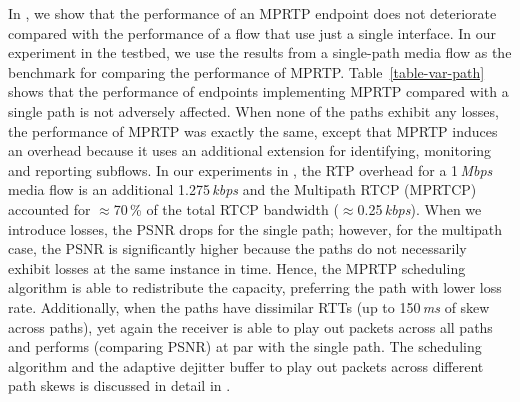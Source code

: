In , we show that the performance of an MPRTP
endpoint does not deteriorate compared with the performance of a flow
that use just a single interface. In our experiment in the testbed, we use the
results from a single-path media flow as the benchmark for comparing the
performance of MPRTP. Table~\ref{table-var-path} shows that the performance of
endpoints implementing MPRTP compared with a single path is not adversely
affected. When none of the paths exhibit any losses, the performance of MPRTP
was exactly the same, except that MPRTP induces an overhead because it uses an
additional extension for identifying, monitoring and reporting subflows. In
our experiments in , the RTP overhead for a 1\,\emph{Mbps} media flow
is an additional 1.275\,\emph{kbps} and the Multipath RTCP (MPRTCP) accounted
for $\approx$70\,\% of the total RTCP bandwidth ($\approx$0.25\,\emph{kbps}).
When we introduce losses, the PSNR drops for the single path; however, for the
multipath case, the PSNR is significantly higher because the paths do not
necessarily exhibit losses at the same instance in time. Hence, the MPRTP
scheduling algorithm is able to redistribute the capacity, preferring the
path with lower loss rate. Additionally, when the paths have dissimilar RTTs
(up to 150\,\emph{ms} of skew across paths), yet again the receiver is able to
play out packets across all paths and performs (comparing PSNR) at par with the
single path. The scheduling algorithm and the adaptive dejitter buffer to
play out packets across different path skews is discussed in detail in
.

\begin{table}
  \begin{center}
\caption{Comparing performance of using a single path with using multiple
paths.}
\label{table-var-path}
\end{center}
\end{table}

